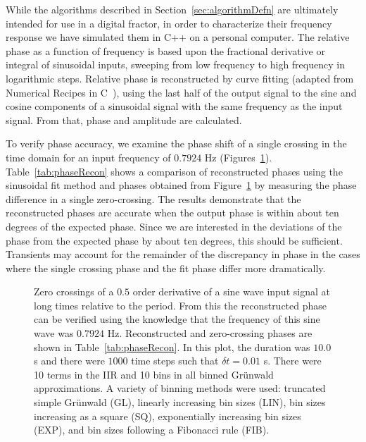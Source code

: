 While the algorithms described in Section~\ref{sec:algorithmDefn} are
ultimately intended for use in a digital fractor, in order to
characterize their frequency response we have simulated them in C++ on a
personal computer. The relative phase as a function of frequency is based upon the
fractional derivative or integral of sinusoidal inputs, sweeping from
low frequency to high frequency in logarithmic steps. Relative phase
is reconstructed by curve fitting (adapted from Numerical Recipes in C~\cite{Press:92}), using the last
half of the output signal to the sine and cosine components of a
sinusoidal signal with the same frequency as the input signal. From that, phase and amplitude are calculated.

To verify phase accuracy, we examine the phase shift of a single
crossing in the time domain for an input frequency of $0.7924$ Hz
(Figures~\ref{fig:timeDomain}). Table~\ref{tab:phaseRecon}
shows a comparison of reconstructed phases using the sinusoidal fit
method and phases obtained from Figure~\ref{fig:timeDomain} by
measuring the phase difference in a single zero-crossing. The results demonstrate that the reconstructed phases are accurate when the output phase is within about ten degrees of the expected phase. Since we are interested in the deviations of the phase from the expected phase by about ten degrees, this should be sufficient. Transients may account for the remainder of the discrepancy in phase in the cases where the single crossing phase and the fit phase differ more dramatically. 


\begin{figure}
\caption{Zero crossings of a $0.5$ order derivative of a sine wave input signal
at long times relative to the period. From this the reconstructed
  phase can be verified using the knowledge that the frequency of this
  sine wave was $0.7924$ Hz. Reconstructed and zero-crossing phases
  are shown in Table~\ref{tab:phaseRecon}. In this plot, the duration
  was $10.0$ s and there were $1000$ time steps such that $\delta t=0.01$ s. There were 10 terms
  in the IIR and 10 bins in all binned Gr{\"u}nwald approximations. A
  variety of binning methods were used: truncated simple Gr{\"u}nwald
  (GL), linearly increasing bin sizes (LIN), bin sizes increasing as a
  square (SQ), exponentially increasing bin sizes (EXP), and bin sizes
  following a Fibonacci rule (FIB).}
\label{fig:timeDomain}
\end{figure}

